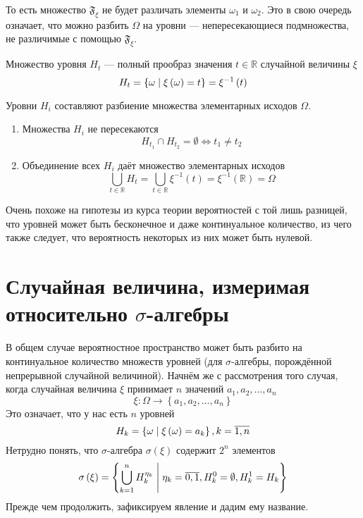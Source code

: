 То есть множество $\mathfrak{F}_\xi$ не будет различать
элементы $\omega_1$ и $\omega_2$.
Это в свою очередь означает, что можно разбить $\Omega$
на уровни --- непересекающиеся подмножества, не различимые с помощью
$\mathfrak{F}_{\xi}$.

\begin{definition}
  Множество уровня $H_t$ --- полный прообраз
  значения $t\in\mathbb{R}$ случайной величины $\xi$
  $$H_t
      = \left\{ \omega \;\middle|\; \xi\left( \omega \right) = t \right\}
      = \xi^{-1}\left( t \right)$$
\end{definition}

\begin{remark}
  Уровни $H_i$ составляют разбиение множества элементарных исходов $\Omega$.
  \begin{enumerate}
      \item Множества $H_i$ не пересекаются
        \begin{equation*}
          H_{t_1} \cap H_{t_2} = \emptyset \Leftrightarrow t_1 \neq t_2 
        \end{equation*}
      \item Объединение всех $H_i$ даёт множество элементарных исходов
      $$\bigcup_{t \in \mathbb{R}} H_t
          = \bigcup_{t \in \mathbb{R}} \xi^{-1}\left( t \right)
          = \xi^{-1}\left( \mathbb{R} \right)
          = \Omega$$
  \end{enumerate}
\end{remark}

Очень похоже на гипотезы из курса теории вероятностей с той лишь разницей,
что уровней может быть бесконечное и даже континуальное количество,
из чего также следует, что вероятность некоторых из них может быть нулевой.

\section{Случайная величина, измеримая относительно $\sigma$-алгебры}
В общем случае вероятностное пространство может быть разбито
на континуальное количество множеств уровней
(для $\sigma$-алгебры, порождённой непрерывной случайной величиной).
Начнём же с рассмотрения того случая,
когда случайная величина $\xi$ принимает $n$ значений
$a_1, a_2, \dots, a_n$
$$\xi: \Omega \rightarrow \left\{ a_1, a_2, \dots, a_n \right\}$$
Это означает, что у нас есть $n$ уровней
$$H_k = \left\{ \omega \;\middle|\; \xi\left( \omega \right) = a_k \right\},
  k= \overline{1,n}$$
Нетрудно понять,
что $\sigma$-алгебра $\sigma\left( \xi \right)$ содержит $2^n$ элементов
$$\sigma\left( \xi \right) = \left\{ \bigcup_{k=1}^n H_k^{\eta_k}
  \;\middle|\; \eta_k = \overline{0,1}, H_k^0 = \emptyset, H_k^1 = H_k \right\}$$
Прежде чем продолжить, зафиксируем явление и дадим ему название.

